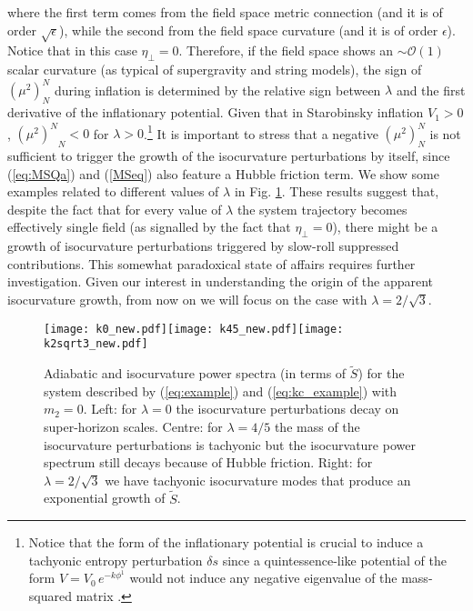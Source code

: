\documentclass[a4paper,11pt]{article}
\newcommand{\mc}{\mathcal}
\begin{document}
where the first term comes from the field space metric connection (and it is of order $\sqrt{\epsilon}$), while the second from the field space curvature (and it is of order $\epsilon$). Notice that in this case $\eta_\perp=0$. Therefore, if the field space shows an $\sim\mc{O}(1)$ scalar curvature (as typical of supergravity and string models), the sign of $(\mu^2)_N^N$ during inflation is determined by the relative sign between $\lambda$ and the first derivative of the inflationary potential. Given that in Starobinsky inflation $V_1>0$, ${\left(\mu^2\right)^N}_N<0$ for $\lambda>0$.\footnote{Notice that the form of the inflationary potential is crucial to induce a tachyonic entropy perturbation $\delta s$ since a quintessence-like potential of the form $V = V_0\,e^{-k\phi^1}$ would not induce any negative eigenvalue of the mass-squared matrix \cite{Cicoli:2019ulk, Cicoli:2020cfj, Cicoli:2020noz}.} It is important to stress that a negative $(\mu^2)_N^N$ is not sufficient to trigger the growth of the isocurvature perturbations by itself, since (\ref{eq:MSQa}) and (\ref{MSeq}) also feature a Hubble friction term. We show some examples related to different values of $\lambda$ in Fig. \ref{fig:isogrowth}. These results suggest that, despite the fact that for every value of $\lambda$ the system trajectory becomes effectively single field (as signalled by the fact that $\eta_\perp=0$), there might be a growth of isocurvature perturbations triggered by slow-roll suppressed contributions. This somewhat paradoxical state of affairs requires further investigation. Given our interest in understanding the origin of the apparent isocurvature growth, from now on we will focus on the case with $\lambda=2/\sqrt{3}$.

\begin{figure}[!t]
\begin{center}
\texttt{[image: k0\_new.pdf]}\texttt{[image: k45\_new.pdf]}\texttt{[image: k2sqrt3\_new.pdf]}
\caption{Adiabatic and isocurvature power spectra (in terms of $\tilde{S}$) for the system described by (\ref{eq:example}) and (\ref{eq:kc_example}) with $m_2=0$. Left: for $\lambda=0$ the isocurvature perturbations decay on super-horizon scales. Centre: for $\lambda=4/5$ the mass of the isocurvature perturbations is tachyonic but the isocurvature power spectrum still decays because of Hubble friction. Right: for $\lambda=2/\sqrt{3}$ we have tachyonic isocurvature modes that produce an exponential growth of $\tilde{S}$.}
\label{fig:isogrowth}
\end{center}
\end{figure}
\end{document}
